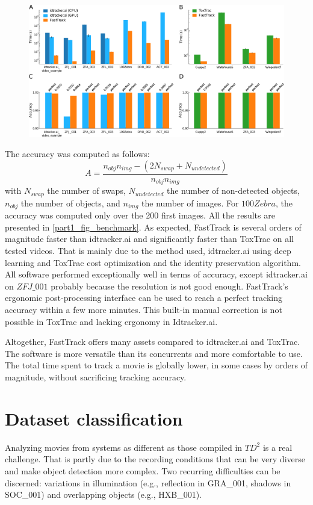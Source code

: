 	\begin{figure}[h!]
    \centering
    \includegraphics[width=\textwidth]{part_1/assets/Figure_benchmark.png}
    \caption{\textbf{} }
    \label{part_1:fig_benchmark}
    \end{figure}

    The accuracy was computed as follows:
    $$ A=\frac{n_{obj}n_{img} - (2N_{swap} + N_{undetected})}{n_{obj}n_{img}}$$
    with $N_{swap}$ the number of swaps, $N_{undetected}$ the number of non-detected objects, $n_{obj}$ the number of objects, and $n_{img}$ the number of images.
    For $100Zebra$, the accuracy was computed only over the 200 first images. All the results are presented in \ref{part1_fig_benchmark}. As expected, FastTrack is several orders of magnitude faster than idtracker.ai and significantly faster than ToxTrac on all tested videos. That is mainly due to the method used, idtracker.ai using deep learning and ToxTrac cost optimization and the identity preservation algorithm.
    All software performed exceptionally well in terms of accuracy, except idtracker.ai on $ZFJ\_001$ probably because the resolution is not good enough.
    FastTrack's ergonomic post-processing interface can be used to reach a perfect tracking accuracy within a few more minutes. This built-in manual correction is not possible in ToxTrac and lacking ergonomy in Idtracker.ai.

    Altogether, FastTrack offers many assets compared to idtracker.ai and ToxTrac. The software is more versatile than its concurrents and more comfortable to use. The total time spent to track a movie is globally lower, in some cases by orders of magnitude, without sacrificing tracking accuracy.

	\section{Dataset classification}
    Analyzing movies from systems as different as those compiled in $TD^2$ is a real challenge. That is partly due to the recording conditions that can be very diverse and make object detection more complex. Two recurring difficulties can be discerned: variations in illumination (e.g., reflection in GRA\_001, shadows in SOC\_001) and overlapping objects (e.g., HXB\_001).


